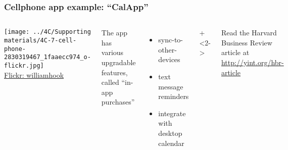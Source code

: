 \begin{frame}\frametitle{Cellphone app example: ``CalApp''}	
	\begin{columns}[T]
			\texttt{[image: ../4C/Supporting materials/4C-7-cell-phone-2830319467\_1faaecc974\_o-flickr.jpg]}
			\\
			\tiny{\href{https://secure.flickr.com/photos/williamhook/2830319467/}{Flickr: williamhook}}
			
		
			The app has various upgradable features, called ``in-app purchases''
			
			\begin{itemize}
				\item	sync-to-other-devices
				\item	text message reminders
				\item	integrate with desktop calendar
			\end{itemize}
			
			\vspace{1cm}
			
			
		\onslide+<2->{	
		}
		
		\vspace{0.5cm}
		{\scriptsize Read the Harvard Business Review article at \href{http://yint.org/hbr-article}{http://yint.org/hbr-article}}
		 
	\end{columns}	
\end{frame}

